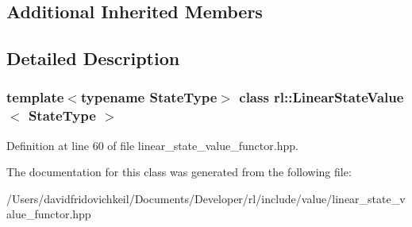 \subsection*{Additional Inherited Members}


\subsection{Detailed Description}
\subsubsection*{template$<$typename State\+Type$>$\newline
class rl\+::\+Linear\+State\+Value$<$ State\+Type $>$}



Definition at line 60 of file linear\+\_\+state\+\_\+value\+\_\+functor.\+hpp.



The documentation for this class was generated from the following file\+:\begin{DoxyCompactItemize}
\item 
/\+Users/davidfridovichkeil/\+Documents/\+Developer/rl/include/value/linear\+\_\+state\+\_\+value\+\_\+functor.\+hpp\end{DoxyCompactItemize}
